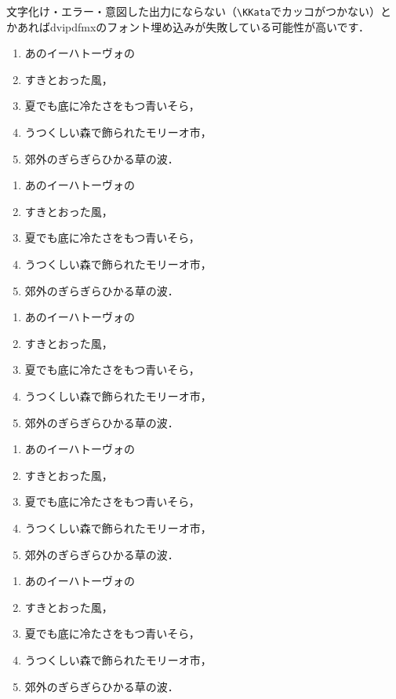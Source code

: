 \documentclass[a4paper, papersize, twocolumn, dvipdfmx, deluxe]{jsarticle}
\begin{document}
文字化け・エラー・意図した出力にならない（\verb|\KKata|でカッコがつかない）とかあればdvipdfmxのフォント埋め込みが失敗している可能性が高いです．

\begin{enumerate}[label=\arabic*]
  \item あのイーハトーヴォの
  \item すきとおった風，
  \item 夏でも底に冷たさをもつ青いそら，
  \item うつくしい森で飾られたモリーオ市，
  \item 郊外のぎらぎらひかる草の波．
\end{enumerate}

\begin{enumerate}[label=\Alph*]
  \item あのイーハトーヴォの
  \item すきとおった風，
  \item 夏でも底に冷たさをもつ青いそら，
  \item うつくしい森で飾られたモリーオ市，
  \item 郊外のぎらぎらひかる草の波．
\end{enumerate}

\begin{enumerate}[label=\alph*]
  \item あのイーハトーヴォの
  \item すきとおった風，
  \item 夏でも底に冷たさをもつ青いそら，
  \item うつくしい森で飾られたモリーオ市，
  \item 郊外のぎらぎらひかる草の波．
\end{enumerate}

\begin{enumerate}[label=\Roman*]
  \item あのイーハトーヴォの
  \item すきとおった風，
  \item 夏でも底に冷たさをもつ青いそら，
  \item うつくしい森で飾られたモリーオ市，
  \item 郊外のぎらぎらひかる草の波．
\end{enumerate}

\begin{enumerate}[label=\roman*]
  \item あのイーハトーヴォの
  \item すきとおった風，
  \item 夏でも底に冷たさをもつ青いそら，
  \item うつくしい森で飾られたモリーオ市，
  \item 郊外のぎらぎらひかる草の波．
\end{enumerate}
\end{document}
